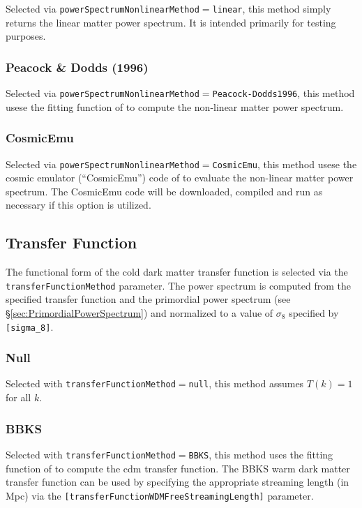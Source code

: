 Selected via {\tt powerSpectrumNonlinearMethod}$=${\tt linear}, this method simply returns the linear matter power spectrum. It is intended primarily for testing purposes.

\subsubsection{Peacock \& Dodds (1996)}

Selected via {\tt powerSpectrumNonlinearMethod}$=${\tt Peacock-Dodds1996}, this method usese the fitting function of \cite{peacock_non-linear_1996} to compute the non-linear matter power spectrum.

\subsubsection{CosmicEmu}

Selected via {\tt powerSpectrumNonlinearMethod}$=${\tt CosmicEmu}, this method usese the cosmic emulator (``CosmicEmu'') code of \cite{lawrence_coyote_2010} to evaluate the non-linear matter power spectrum. The CosmicEmu code will be downloaded, compiled and run as necessary if this option is utilized.

\subsection{Transfer Function}\label{sec:TransferFunction}

The functional form of the cold dark matter transfer function is selected via the {\tt transferFunctionMethod} parameter. The power spectrum is computed from the specified transfer function and the primordial power spectrum (see \S\ref{sec:PrimordialPowerSpectrum}) and normalized to a value of $\sigma_8$ specified by {\tt [sigma\_8]}.

\subsubsection{Null}

Selected with {\tt transferFunctionMethod}$=${\tt null}, this method assumes $T(k)=1$ for all $k$.

\subsubsection{BBKS}

Selected with {\tt transferFunctionMethod}$=${\tt BBKS}, this method uses the fitting function of \cite{bardeen_statistics_1986} to compute the \gls{cdm} transfer function. The BBKS warm dark matter transfer function can be used by specifying the appropriate streaming length (in Mpc) via the {\tt [transferFunctionWDMFreeStreamingLength]} parameter.

